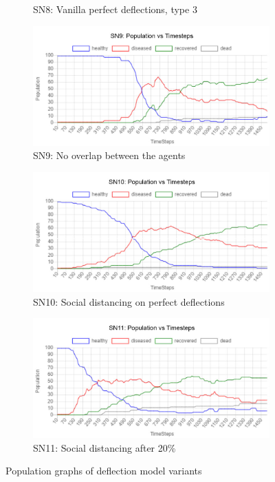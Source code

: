 \documentclass[a4paper,11pt]{article}
\begin{document}
\begin{figure}[H]
\begin{subfigure}[b]{0.49\linewidth}
            \caption{SN8: Vanilla perfect deflections, type 3}
            \label{fig:SN8T3}
        \end{subfigure}
        \begin{subfigure}[b]{0.49\linewidth}
            \includegraphics[width=\linewidth]{pop_graphs/SN9_pop.jpg}
            \caption{SN9: No overlap between the agents}
            \label{fig:SN9}
        \end{subfigure}
        \begin{subfigure}[b]{0.49\linewidth}
            \includegraphics[width=\linewidth]{pop_graphs/SN10_pop.jpg}
            \caption{SN10: Social distancing on perfect deflections}
            \label{fig:SN10}
        \end{subfigure}
        \begin{subfigure}[b]{0.49\linewidth}
            \includegraphics[width=\linewidth]{pop_graphs/SN11_pop.jpg}
            \caption{SN11: Social distancing after 20\%}
            \label{fig:SN11}
        \end{subfigure}
        \caption{Population graphs of deflection model variants}
    \end{figure}
\end{document}
